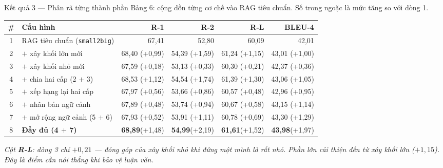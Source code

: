 \documentclass[aspectratio=169,10pt]{beamer}
\begin{document}
\begin{frame}{Kết quả 3 --- Phân rã từng thành phần}
  {\small Bảng 6: cộng dồn từng cơ chế vào RAG tiêu chuẩn. Số trong ngoặc là mức tăng so với dòng 1.}
  \begin{center}
  \footnotesize
  \begin{tabular}{clrrrr}
    \toprule
    \textbf{\#} & \textbf{Cấu hình} & \textbf{R-1} & \textbf{R-2} & \textbf{R-L} & \textbf{BLEU-4} \\
    \midrule
    1 & RAG tiêu chuẩn (\texttt{small2big}) & 67{,}41 & 52{,}80 & 60{,}09 & 42{,}01 \\
    2 & $+$ xây khối lớn mới & 68{,}40 \;(+0{,}99) & 54{,}39 \;(+1{,}59) & 61{,}24 \;(+1{,}15) & 43{,}01 \;(+1{,}00) \\
    3 & $+$ xây khối nhỏ mới & 67{,}59 \;(+0{,}18) & 53{,}13 \;(+0{,}33) & 60{,}30 \;(+0{,}21) & 42{,}37 \;(+0{,}36) \\
    4 & $+$ chia hai cấp (2 $+$ 3) & 68{,}53 \;(+1{,}12) & 54{,}54 \;(+1{,}74) & 61{,}39 \;(+1{,}30) & 43{,}06 \;(+1{,}05) \\
    \midrule
    5 & $+$ xếp hạng lại hai cấp & 67{,}97 \;(+0{,}56) & 53{,}66 \;(+0{,}86) & 60{,}57 \;(+0{,}48) & 42{,}96 \;(+0{,}95) \\
    6 & $+$ nhân bản ngữ cảnh & 67{,}89 \;(+0{,}48) & 53{,}74 \;(+0{,}94) & 60{,}67 \;(+0{,}58) & 43{,}15 \;(+1{,}14) \\
    7 & $+$ mở rộng ngữ cảnh (5 $+$ 6) & 67{,}93 \;(+0{,}52) & 53{,}91 \;(+1{,}11) & 60{,}78 \;(+0{,}69) & 43{,}30 \;(+1{,}29) \\
    8 & \textbf{Đầy đủ (4 $+$ 7)} & \textbf{68{,}89}\;(+1{,}48) & \textbf{54{,}99}\;(+2{,}19) & \textbf{61{,}61}\;(+1{,}52) & \textbf{43{,}98}\;(+1{,}97) \\
    \bottomrule
  \end{tabular}
  \end{center}
  \vspace{0.25em}
  {\footnotesize\itshape Cột \textbf{R-L}: dòng 3 chỉ $+0{,}21$ --- đóng góp của
  \emph{xây khối nhỏ} khi đứng một mình là rất nhỏ. Phần lớn cải thiện đến từ
  \emph{xây khối lớn} ($+1{,}15$). Đây là điểm cần nói thẳng khi bảo vệ luận văn.}
\end{frame}
\end{document}
